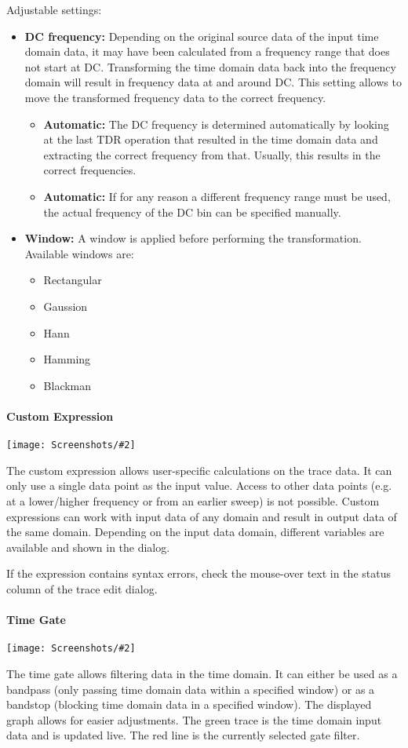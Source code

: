 \documentclass[a4paper,11pt]{article}
\newcommand{\screenshot}[2]{\begin{center}
\texttt{[image: Screenshots/\#2]}
\end{center}}
\begin{document}
Adjustable settings:
\begin{itemize}
\item \textbf{DC frequency:} Depending on the original source data of the input time domain data, it may have been calculated from a frequency range that does not start at DC. Transforming the time domain data back into the frequency domain will result in frequency data at and around DC. This setting allows to move the transformed frequency data to the correct frequency.
\begin{itemize}
\item \textbf{Automatic:} The DC frequency is determined automatically by looking at the last TDR operation that resulted in the time domain data and extracting the correct frequency from that. Usually, this results in the correct frequencies.
\item \textbf{Automatic:} If for any reason a different frequency range must be used, the actual frequency of the DC bin can be specified manually.
\end{itemize}
\item \textbf{Window:} A window is applied before performing the transformation. Available windows are:
\begin{itemize}
\item Rectangular
\item Gaussion
\item Hann
\item Hamming
\item Blackman
\end{itemize}
\end{itemize}
\paragraph{Custom Expression}
\screenshot{1.0}{MathOpCustomExpression.png}
The custom expression allows user-specific calculations on the trace data. It can only use a single data point as the input value. Access to other data points (e.g. at a lower/higher frequency or from an earlier sweep) is not possible. Custom expressions can work with input data of any domain and result in output data of the same domain. Depending on the input data domain, different variables are available and shown in the dialog.

If the expression contains syntax errors, check the mouse-over text in the status column of the trace edit dialog.
\paragraph{Time Gate}
\screenshot{1.0}{MathOpTimeGate.png}
The time gate allows filtering data in the time domain. It can either be used as a bandpass (only passing time domain data within a specified window) or as a bandstop (blocking time domain data in a specified window). The displayed graph allows for easier adjustments. The green trace is the time domain input data and is updated live. The red line is the currently selected gate filter.
\end{document}
